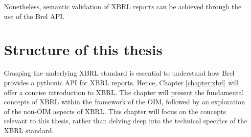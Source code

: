 Nonetheless, semantic validation of XBRL reports can be achieved through the use of the Brel API.

\section{Structure of this thesis}

Grasping the underlying XBRL standard is essential to understand how Brel provides a pythonic API for XBRL reports.
Hence, Chapter \ref{chapter:xbrl} will offer a concise introduction to XBRL.
The chapter will present the fundamental concepts of XBRL within the framework of the OIM, followed by an exploration of the non-OIM aspects of XBRL.
This chapter will focus on the concepts relevant to this thesis, rather than delving deep into the technical specifics of the XBRL standard.

